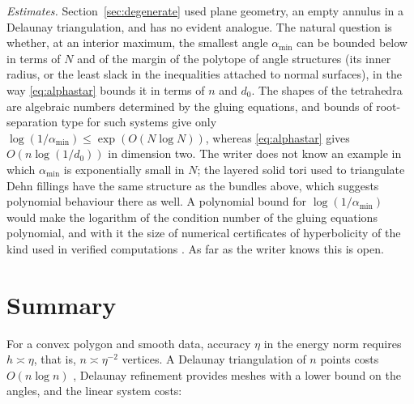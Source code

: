 \documentclass[11pt]{amsart}
\theoremstyle{definition}
\theoremstyle{remark}
\begin{document}
\emph{Estimates.} Section~\ref{sec:degenerate} used plane geometry, an empty annulus in a Delaunay triangulation, and has no evident analogue. The natural question is whether, at an interior maximum, the smallest angle $\alpha_{\min}$ can be bounded below in terms of $N$ and of the margin of the polytope of angle structures (its inner radius, or the least slack in the inequalities attached to normal surfaces),
in the way \eqref{eq:alphastar} bounds it in terms of $n$ and $d_0$. The shapes of the tetrahedra are algebraic numbers determined by the gluing equations, and bounds of root-separation type for such systems give only $\log(1/\alpha_{\min})\le\exp(O(N\log N))$, whereas \eqref{eq:alphastar} gives $O(n\log(1/d_0))$ in dimension two.
The writer does not know an example in which $\alpha_{\min}$ is exponentially small in $N$; the layered solid tori used to triangulate Dehn fillings \cite{GS10} have the same structure as the bundles above, which suggests polynomial behaviour there as well. A polynomial bound for $\log(1/\alpha_{\min})$ would make the logarithm of the condition number of the gluing equations polynomial, and with it the size of numerical certificates of hyperbolicity of the kind used in verified computations \cite{HIKMOT16}. As far as the writer knows this is open.

\section{Summary}

For a convex polygon and smooth data, accuracy $\eta$ in the energy norm requires $h\asymp\eta$, that is, $n\asymp\eta^{-2}$ vertices. A Delaunay triangulation of $n$ points costs $O(n\log n)$ \cite{Chew89}, Delaunay refinement \cite{Rup95} provides meshes with a lower bound on the angles, and the linear system costs:
\end{document}
